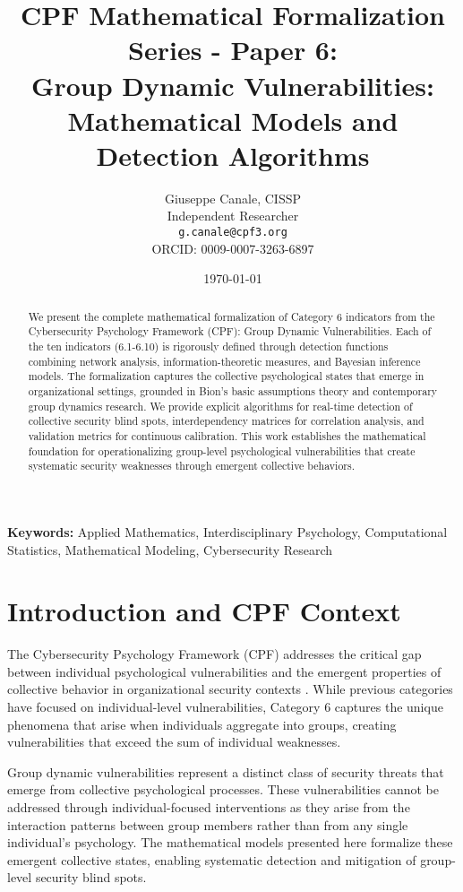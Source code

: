 \documentclass[11pt,a4paper]{article}
\title{CPF Mathematical Formalization Series - Paper 6:\\Group Dynamic Vulnerabilities: Mathematical Models and Detection Algorithms}
\author{
    Giuseppe Canale, CISSP\\
    Independent Researcher\\
    \texttt{g.canale@cpf3.org}\\
    ORCID: 0009-0007-3263-6897
}
\date{\today}
\begin{document}
\maketitle

\begin{abstract}
We present the complete mathematical formalization of Category 6 indicators from the Cybersecurity Psychology Framework (CPF): Group Dynamic Vulnerabilities. Each of the ten indicators (6.1-6.10) is rigorously defined through detection functions combining network analysis, information-theoretic measures, and Bayesian inference models. The formalization captures the collective psychological states that emerge in organizational settings, grounded in Bion's basic assumptions theory and contemporary group dynamics research. We provide explicit algorithms for real-time detection of collective security blind spots, interdependency matrices for correlation analysis, and validation metrics for continuous calibration. This work establishes the mathematical foundation for operationalizing group-level psychological vulnerabilities that create systematic security weaknesses through emergent collective behaviors.
\end{abstract}

\textbf{Keywords:} Applied Mathematics, Interdisciplinary Psychology, Computational Statistics, Mathematical Modeling, Cybersecurity Research

\section{Introduction and CPF Context}

The Cybersecurity Psychology Framework (CPF) addresses the critical gap between individual psychological vulnerabilities and the emergent properties of collective behavior in organizational security contexts \cite{canale2024cpf}. While previous categories have focused on individual-level vulnerabilities, Category 6 captures the unique phenomena that arise when individuals aggregate into groups, creating vulnerabilities that exceed the sum of individual weaknesses.

Group dynamic vulnerabilities represent a distinct class of security threats that emerge from collective psychological processes. These vulnerabilities cannot be addressed through individual-focused interventions as they arise from the interaction patterns between group members rather than from any single individual's psychology. The mathematical models presented here formalize these emergent collective states, enabling systematic detection and mitigation of group-level security blind spots.
\end{document}
